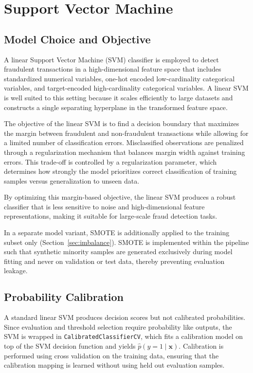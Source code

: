 \documentclass[oneside,12pt,parskip=half,american,numbers=noenddot]{scrreprt}
\begin{document}
\section{Support Vector Machine}
\label{sec:svm}

\subsection{Model Choice and Objective}
A linear Support Vector Machine (SVM) classifier is employed to detect fraudulent transactions in a high-dimensional feature space that includes standardized numerical variables, one-hot encoded low-cardinality categorical variables, and target-encoded high-cardinality categorical variables. A linear SVM is well suited to this setting because it scales efficiently to large datasets and constructs a single separating hyperplane in the transformed feature space.

The objective of the linear SVM is to find a decision boundary that maximizes the margin between fraudulent and non-fraudulent transactions while allowing for a limited number of classification errors. Misclassified observations are penalized through a regularization mechanism that balances margin width against training errors. This trade-off is controlled by a regularization parameter, which determines how strongly the model prioritizes correct classification of training samples versus generalization to unseen data.

By optimizing this margin-based objective, the linear SVM produces a robust classifier that is less sensitive to noise and high-dimensional feature representations, making it suitable for large-scale fraud detection tasks.

In a separate model variant, SMOTE is additionally applied to the training subset only (Section~\ref{sec:imbalance}). SMOTE is implemented within the pipeline such that synthetic minority samples are generated exclusively during model fitting and never on validation or test data, thereby preventing evaluation leakage.
\subsection{Probability Calibration}
A standard linear SVM produces decision scores but not calibrated probabilities. Since evaluation and threshold selection require probability like outputs, the SVM is wrapped in \texttt{CalibratedClassifierCV}, which fits a calibration model on top of the SVM decision function and yields $\hat{p}(y=1 \mid \mathbf{x})$. Calibration is performed using cross validation on the training data, ensuring that the calibration mapping is learned without using held out evaluation samples.
\end{document}
